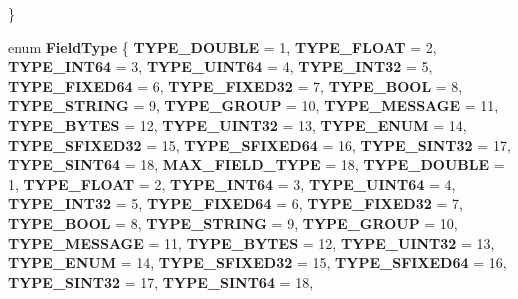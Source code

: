 \begin{DoxyCompactItemize}
 \}
\item 
\mbox{\label{classgoogle_1_1protobuf_1_1internal_1_1WireFormatLite_aaffa24b0edf986fa1541988d845e92ca}} 
enum {\bfseries Field\+Type} \{ \newline
{\bfseries T\+Y\+P\+E\+\_\+\+D\+O\+U\+B\+LE} = 1, 
{\bfseries T\+Y\+P\+E\+\_\+\+F\+L\+O\+AT} = 2, 
{\bfseries T\+Y\+P\+E\+\_\+\+I\+N\+T64} = 3, 
{\bfseries T\+Y\+P\+E\+\_\+\+U\+I\+N\+T64} = 4, 
\newline
{\bfseries T\+Y\+P\+E\+\_\+\+I\+N\+T32} = 5, 
{\bfseries T\+Y\+P\+E\+\_\+\+F\+I\+X\+E\+D64} = 6, 
{\bfseries T\+Y\+P\+E\+\_\+\+F\+I\+X\+E\+D32} = 7, 
{\bfseries T\+Y\+P\+E\+\_\+\+B\+O\+OL} = 8, 
\newline
{\bfseries T\+Y\+P\+E\+\_\+\+S\+T\+R\+I\+NG} = 9, 
{\bfseries T\+Y\+P\+E\+\_\+\+G\+R\+O\+UP} = 10, 
{\bfseries T\+Y\+P\+E\+\_\+\+M\+E\+S\+S\+A\+GE} = 11, 
{\bfseries T\+Y\+P\+E\+\_\+\+B\+Y\+T\+ES} = 12, 
\newline
{\bfseries T\+Y\+P\+E\+\_\+\+U\+I\+N\+T32} = 13, 
{\bfseries T\+Y\+P\+E\+\_\+\+E\+N\+UM} = 14, 
{\bfseries T\+Y\+P\+E\+\_\+\+S\+F\+I\+X\+E\+D32} = 15, 
{\bfseries T\+Y\+P\+E\+\_\+\+S\+F\+I\+X\+E\+D64} = 16, 
\newline
{\bfseries T\+Y\+P\+E\+\_\+\+S\+I\+N\+T32} = 17, 
{\bfseries T\+Y\+P\+E\+\_\+\+S\+I\+N\+T64} = 18, 
{\bfseries M\+A\+X\+\_\+\+F\+I\+E\+L\+D\+\_\+\+T\+Y\+PE} = 18, 
{\bfseries T\+Y\+P\+E\+\_\+\+D\+O\+U\+B\+LE} = 1, 
\newline
{\bfseries T\+Y\+P\+E\+\_\+\+F\+L\+O\+AT} = 2, 
{\bfseries T\+Y\+P\+E\+\_\+\+I\+N\+T64} = 3, 
{\bfseries T\+Y\+P\+E\+\_\+\+U\+I\+N\+T64} = 4, 
{\bfseries T\+Y\+P\+E\+\_\+\+I\+N\+T32} = 5, 
\newline
{\bfseries T\+Y\+P\+E\+\_\+\+F\+I\+X\+E\+D64} = 6, 
{\bfseries T\+Y\+P\+E\+\_\+\+F\+I\+X\+E\+D32} = 7, 
{\bfseries T\+Y\+P\+E\+\_\+\+B\+O\+OL} = 8, 
{\bfseries T\+Y\+P\+E\+\_\+\+S\+T\+R\+I\+NG} = 9, 
\newline
{\bfseries T\+Y\+P\+E\+\_\+\+G\+R\+O\+UP} = 10, 
{\bfseries T\+Y\+P\+E\+\_\+\+M\+E\+S\+S\+A\+GE} = 11, 
{\bfseries T\+Y\+P\+E\+\_\+\+B\+Y\+T\+ES} = 12, 
{\bfseries T\+Y\+P\+E\+\_\+\+U\+I\+N\+T32} = 13, 
\newline
{\bfseries T\+Y\+P\+E\+\_\+\+E\+N\+UM} = 14, 
{\bfseries T\+Y\+P\+E\+\_\+\+S\+F\+I\+X\+E\+D32} = 15, 
{\bfseries T\+Y\+P\+E\+\_\+\+S\+F\+I\+X\+E\+D64} = 16, 
{\bfseries T\+Y\+P\+E\+\_\+\+S\+I\+N\+T32} = 17, 
\newline
{\bfseries T\+Y\+P\+E\+\_\+\+S\+I\+N\+T64} = 18, 

\end{DoxyCompactItemize}
